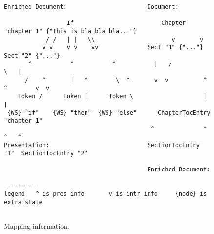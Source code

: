 \begin{figure}
\begin{center}
\begin{center}
\begin{footnotesize}
\begin{verbatim}
Enriched Document:                       Document:                                                                                            
                                                                                            
                  If                         Chapter "chapter 1" {"this is bla bla bla..."} 
            / /   | |   \\                      v       v                                     
           v v    v v    vv              Sect "1" {"..."}     Sect "2" {"..."}                
       ^           ^           ^           |   /                    \   |                            
      /    ^       |   ^        \  ^       v  v          ^  ^        v  v                          
    Token /      Token |      Token \                    |  |                             
 {WS} "if"    {WS} "then"  {WS} "else"      ChapterTocEntry "chapter 1"                     
                                          ^              ^                 ^   ^              
Presentation:                            SectionTocEntry "1"  SectionTocEntry "2"           
                                                                                            
                                         Enriched Document:                                 

----------                                                                        
legend   ^ is pres info       v is intr info     {node} is extra state            
                                                                                  
\end{verbatim}  
\end{footnotesize}                                                                  
\end{center}                                                                      
\caption{Mapping information.}\label{info}                          
\end{center}                                                                      
\end{figure}

